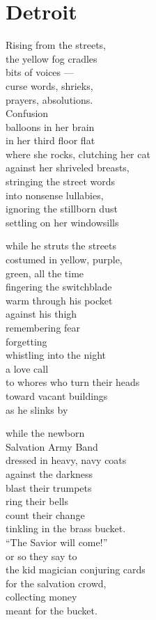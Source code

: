 \documentclass[twoside,10pt]{book}
\begin{document}
\clearpage
\section{Detroit}

Rising from the streets,\\
the yellow fog cradles\\
bits of voices ­---\\
curse words, shrieks,\\
prayers, absolutions.\\
Confusion\\
balloons in her brain\\
in her third floor flat\\
where she rocks, clutching her cat\\
against her shriveled breasts,\\
stringing the street words\\
into nonsense lullabies,\\
ignoring the stillborn dust\\
settling on her windowsills

while he struts the streets\\
costumed in yellow, purple,\\
green, all the time\\
fingering the switchblade\\
warm through his pocket\\
against his thigh\\
remembering fear\\
forgetting\\
whistling into the night\\
a love call\\
to whores who turn their heads\\
toward vacant buildings\\
as he slinks by

while the newborn\\
Salvation Army Band\\
dressed in heavy, navy coats\\
against the darkness\\
blast their trumpets\\
ring their bells\\
count their change\\
tinkling in the brass bucket.\\
``The Savior will come!''\\
or so they say to\\
the kid magician conjuring cards\\
for the salvation crowd,\\
collecting money\\
meant for the bucket.
\end{document}
